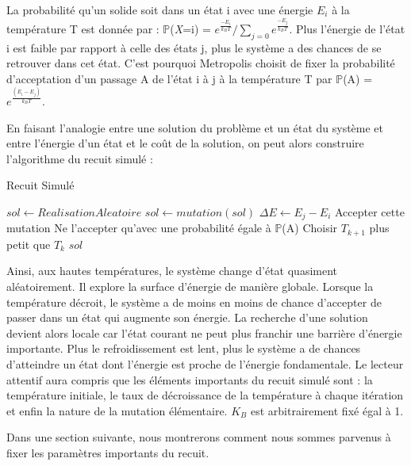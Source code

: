\documentclass{article}%
\begin{document}
	La probabilité qu'un solide soit dans un état i avec une énergie $E_i$ à la température T est donnée par : $\mathbb{P}$(\emph{X}=i) = $e^{\frac{-E_i}{k_BT}} / \sum_{j=0} e^{\frac{-E_j}{k_BT}}$. Plus l'énergie de l'état i est faible par rapport à celle des états j, plus le système a des chances de se retrouver dans cet état. C'est pourquoi Metropolis choisit de fixer la probabilité d'acceptation d'un passage A de l'état i à j à la température T par $\mathbb{P}$(A) = $e^\frac{(E_i-E_j)}{k_BT}$.
	
	\vspace{1cm}
	
	En faisant l'analogie entre une solution du problème et un état du système et entre l'énergie d'un état et le coût de la solution, on peut alors construire l'algorithme du recuit simulé :
	
	\begin{algorithm} 
	\caption{Recuit Simulé}
	\begin{algorithmic}
	
	\STATE $sol \leftarrow RealisationAleatoire$
		\STATE $sol \leftarrow mutation( sol ) $
		\STATE $\Delta{E} \leftarrow E_j-E_i$
			\STATE Accepter cette mutation	
		\ELSE 
			\STATE Ne l'accepter qu'avec une probabilité égale à $\mathbb{P}$(A)
		\ENDIF
		\STATE Choisir $T_{k+1}$ plus petit que $T_{k}$
	\ENDFOR
	\RETURN $sol$
	\end{algorithmic}
	\end{algorithm}
\vspace{1cm}

Ainsi, aux hautes températures, le système change d'état quasiment aléatoirement. Il explore la surface d'énergie de manière globale. Lorsque la température décroit, le système a de moins en moins de chance d'accepter de passer dans un état qui augmente son énergie. La recherche d'une solution devient alors locale car l'état courant ne peut plus franchir une barrière d'énergie importante. Plus le refroidissement est lent, plus le système a de chances d'atteindre un état dont l'énergie est proche de l'énergie fondamentale. Le lecteur attentif aura compris que les éléments importants du recuit simulé sont : la température initiale, le taux de décroissance de la température à chaque itération et enfin la nature de la mutation élémentaire. $K_B$ est arbitrairement fixé égal à 1.

Dans une section suivante, nous montrerons comment nous sommes parvenus à fixer les paramètres importants du recuit.
\end{document}
